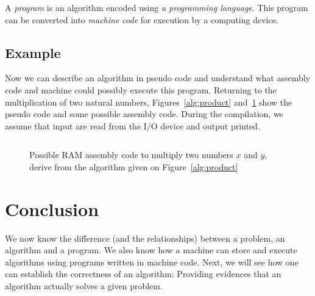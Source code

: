 \documentclass {aldast}
\begin{document}
\begin{takeaway}
  A \emph{program} is an algorithm encoded using \emph{a programming
    language}. This program can be converted into \emph{machine code}
  for execution by a computing device.
\end{takeaway}

\subsection{Example}
\label{sec:example}

Now we can describe an algorithm in pseudo code and understand what
assembly code and machine could possibly execute this
program. Returning to the multiplication of two natural numbers,
Figures~\ref{alg:product} and~\ref{asm:product} show the pseudo code
and some possible assembly code. During the compilation, we assume
that input are read from the I/O device and output printed.

\begin{figure}
  \centering
  \inputminted{asm}{code/multiplication.asm}
  \caption{Possible RAM assembly code to multiply two numbers $x$ and $y$, derive from the algorithm given on Figure~\ref{alg:product}}
  \label{asm:product}
\end{figure}


\section*{Conclusion}
We now know the difference (and the relationships) between a problem,
an algorithm and a program. We also know how a machine can store and
execute algorithms using programs written in machine code. Next, we
will see how one can establish the correctness of an algorithm:
Providing evidences that an algorithm actually solves a given problem.




\end{document}
